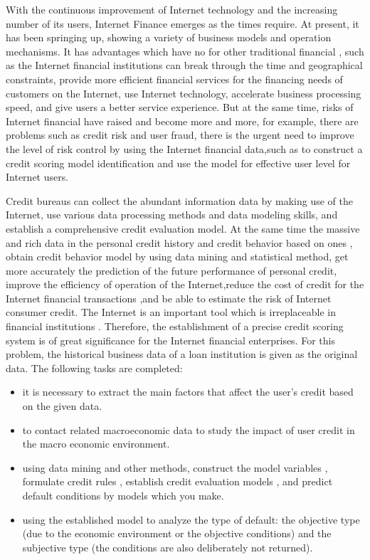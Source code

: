 \documentclass{mcmthesis}
\begin{document}
With the continuous improvement of Internet technology and the increasing number of its users, Internet Finance emerges as the times require. At present, it has been springing up, showing a variety of business models and operation mechanisms. It has advantages which have no for other traditional financial , such as the Internet financial institutions can break through the time and geographical constraints,  provide more efficient financial services for the financing needs of customers on the Internet,  use Internet technology, accelerate business processing speed, and give users a better service experience. But at the same time, risks of Internet financial have raised and become more and more, for example, there are problems such as credit risk and user fraud, there is the urgent need to improve the level of risk control by using the Internet financial data,such as to construct a credit scoring model identification and use the model for effective user level for Internet users.

Credit bureaus can collect the abundant information data by making use of  the Internet, use various data processing methods and data modeling skills, and establish a comprehensive credit evaluation model. At the same time the massive and rich data in the personal credit history and credit behavior based on ones , obtain credit behavior model by using data mining and statistical method,  get more accurately the prediction of the future performance of personal credit, improve the efficiency of operation of the Internet,reduce the cost of credit for the Internet financial transactions ,and be able to estimate the risk of Internet consumer credit. The Internet is an important tool which is irreplaceable in financial institutions . Therefore, the establishment of a precise credit scoring system is of great significance for the Internet financial enterprises. For this problem, the historical business data of a loan institution is given as the original data. The following tasks are completed:
\begin{itemize}
\item it is necessary to extract the main factors that affect the user's credit based on the given data.
\item to contact related macroeconomic data to study the impact of user credit in the macro economic environment.
\item using data mining and other methods, construct the model variables ,  formulate credit rules , establish credit evaluation models , and predict default conditions by models which you make.
\item using the established model to analyze the type of default: the objective type (due to the economic environment or the objective conditions) and the subjective type (the conditions are also deliberately not returned).
\end{itemize}
\end{document}
